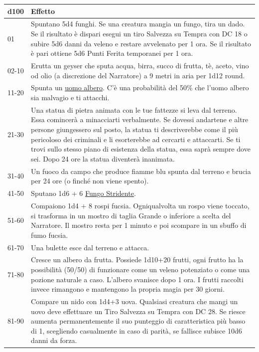 \begin{multicols}{2}
\noindent\begin{tabularx}{0.50\textwidth}{lX}
	\toprule
\textbf{d100} & \textbf{Effetto}\\
\toprule
01 &Spuntano 5d4 funghi. Se una creatura mangia un fungo, tira un dado. Se il risultato è dispari esegui un tiro Salvezza su Tempra con DC 18 o subire 5d6 danni da veleno e restare avvelenato per 1 ora. Se il risultato è pari ottiene 5d6 Punti Ferita temporanei per 1 ora.\\
02-10 &Erutta un geyser che sputa acqua, birra, succo di frutta, tè, aceto, vino od olio (a discrezione del Narratore) a 9 metri in aria per 1d12 round.\\
11-20 &Spunta un \hyperlink{Uomo Albero (Arborom)}{uomo albero}. C'è una probabilità del 50\% che l'uomo albero sia malvagio e ti attacchi.\\
21-30 &Una statua di pietra animata con le tue fattezze si leva dal terreno. Essa comincerà a minacciarti verbalmente. Se dovessi andartene e altre persone giungessero sul posto, la statua ti descriverebbe come il più pericoloso dei criminali e li esorterebbe ad cercarti e attaccarti. Se ti trovi sullo stesso piano di esistenza della statua, essa saprà sempre dove sei. Dopo 24 ore la statua diventerà inanimata.\\
31-40 &Un fuoco da campo che produce fiamme blu spunta dal terreno e brucia per 24 ore (o finché non viene spento).\\
41-50 &Sputano 1d6 + 6 \hyperlink{Fungo Stridente}{Fungo Stridente}.\\
51-60 &Compaiono 1d4 + 8 rospi fucsia. Ogniqualvolta un rospo viene toccato, si trasforma in un mostro di taglia Grande o inferiore a scelta del Narratore. Il mostro resta per 1 minuto e poi scompare in un sbuffo di fumo fucsia. \\
61-70 & Una bulette esce dal terreno e attacca.\\
71-80 &Cresce un albero da frutta. Possiede 1d10+20 frutti, ogni frutto ha la possibilità (50/50) di funzionare come un veleno potenziato o come una pozione naturale a caso. L'albero svanisce dopo 1 ora. I frutti raccolti invece rimangono e mantengono la propria magia per 30 giorni. \\
81-90 &Compare un nido con 1d4+3 uova. Qualsiasi creatura che mangi un uovo deve effettuare un Tiro Salvezza su Tempra con DC 28. Se riesce aumenta permanentemente il suo punteggio di caratteristica più basso di 1, scegliendo casualmente in caso di parità, se fallisce subisce 10d6 danni da forza.\\

\end{tabularx}
\end{multicols}
